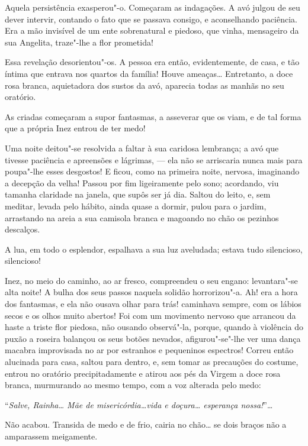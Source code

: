 Aquela persistência exasperou"-o. Começaram as indagações. A avó julgou
de seu dever intervir, contando o fato que se passava consigo, e
aconselhando paciência. Era a mão invisível de um ente sobrenatural e
piedoso, que vinha, mensageiro da sua Angelita, traze"-lhe a flor
prometida!

Essa revelação desorientou"-os. A pessoa era então, evidentemente, de
casa, e tão íntima que entrava nos quartos da família! Houve ameaças\ldots{}
Entretanto, a doce rosa branca, aquietadora dos sustos da avó, aparecia
todas as manhãs no seu oratório.

As criadas começaram a supor fantasmas, a asseverar que os viam, e de
tal forma que a própria Inez entrou de ter medo!

Uma noite deitou"-se resolvida a faltar à sua caridosa lembrança; a avó
que tivesse paciência e apreensões e lágrimas, --- ela não se arriscaria
nunca mais para poupa"-lhe esses desgostos! E ficou, como na primeira
noite, nervosa, imaginando a decepção da velha! Passou por fim
ligeiramente pelo sono; acordando, viu tamanha claridade na janela, que
supôs ser já dia. Saltou do leito, e, sem meditar, levada pelo hábito,
ainda quase a dormir, pulou para o jardim, arrastando na areia a sua
camisola branca e magoando no chão os pezinhos descalços.

A lua, em todo o esplendor, espalhava a sua luz aveludada; estava tudo
silencioso, silencioso!

Inez, no meio do caminho, ao ar fresco, compreendeu o seu engano:
levantara"-se alta noite! A bulha dos seus passos naquela solidão
horrorizou"-a. Ah! era a hora dos fantasmas, e ela não ousava olhar para
trás! caminhava sempre, com os lábios secos e os olhos muito abertos!
Foi com um movimento nervoso que arrancou da haste a triste flor
piedosa, não ousando observá"-la, porque, quando à violência do puxão a
roseira balançou os seus botões nevados, afigurou"-se"-lhe ver uma dança
macabra improvisada no ar por estranhos e pequeninos espectros! Correu
então alucinada para casa, saltou para dentro, e, sem tomar as
precauções do costume, entrou no oratório precipitadamente e atirou aos
pés da Virgem a doce rosa branca, murmurando ao mesmo tempo, com a voz
alterada pelo medo:

``\emph{Salve, Rainha\ldots{} Mãe de misericórdia\ldots{}vida e doçura\ldots{}
esperança nossa!}''\ldots{}

Não acabou. Transida de medo e de frio, cairia no chão\ldots{} se dois braços
não a amparassem meigamente.

